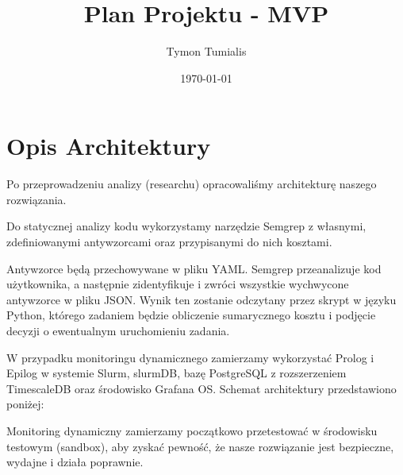 \documentclass[12pt,a4paper]{article}
\title{Plan Projektu - MVP}
\author{Tymon Tumialis}
\date{\today}
\begin{document}
\maketitle

\section*{Opis Architektury}

Po przeprowadzeniu analizy (researchu) opracowaliśmy architekturę naszego rozwiązania.

Do statycznej analizy kodu wykorzystamy narzędzie Semgrep z własnymi, zdefiniowanymi antywzorcami oraz przypisanymi do nich kosztami. 

Antywzorce będą przechowywane w pliku YAML. Semgrep przeanalizuje kod użytkownika, a następnie zidentyfikuje i zwróci wszystkie wychwycone antywzorce w pliku JSON. Wynik ten zostanie odczytany przez skrypt w języku Python, którego zadaniem będzie obliczenie sumarycznego kosztu i podjęcie decyzji o ewentualnym uruchomieniu zadania.

W przypadku monitoringu dynamicznego zamierzamy wykorzystać Prolog i Epilog w systemie Slurm, slurmDB, bazę PostgreSQL z rozszerzeniem TimescaleDB oraz środowisko Grafana OS. Schemat architektury przedstawiono poniżej:

\vspace{1cm}
\begin{center}
\end{center}
\vspace{1cm}

Monitoring dynamiczny zamierzamy początkowo przetestować w środowisku testowym (sandbox), aby zyskać pewność, że nasze rozwiązanie jest bezpieczne, wydajne i działa poprawnie.
\end{document}
